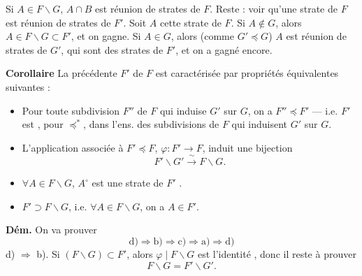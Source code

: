 \documentclass[11pt,a4paper]{article}
\begin{document}
Si $A \in F \smallsetminus G$, $A \cap B$ est réunion de strates de $F$.  Reste : voir qu'une strate  de $F$ est réunion de strates de $F'$. Soit $A$ cette strate de $F$.   Si $A \notin G$, alors $A \in F \smallsetminus G \subset F'$, et on gagne. Si $A \in G$, alors (comme $G' \preccurlyeq G$) $A$ est réunion de strates de $G'$, qui sont des strates de $F'$, et on a gagné encore.

\textbf{Corollaire} La   précédente $F'$ de $F$ est caractérisée par  propriétés équivalentes suivantes :
\begin{itemize}
  \item[a)] Pour toute subdivision $F''$ de $F$ qui induise $G'$ sur $G$, on a $F'' \preccurlyeq F'$ — i.e. $F'$ est  , pour $\preccurlyeq^{*}$, dans l'ens. des subdivisions de $F$ qui induisent $G'$ sur $G$.
  \item[b)] L'application  associée à $F' \preccurlyeq F$, $\varphi : F' \to F$, induit une bijection
  \[
    F' \smallsetminus G' \xrightarrow{\ \sim\ } F \smallsetminus G .
  \]
  \item[c)] $\forall A \in F \smallsetminus G$, $A^{\circ}$ est une strate \struck{\ill{}} de $F'$ \struck{\ill{}}.
  \item[d)] $F' \supset F \smallsetminus G$, i.e. $\forall A \in F \smallsetminus G$, on a $A \in F'$.
\end{itemize}

\textbf{Dém.} On va prouver
\[
  \text{d)} \Longrightarrow \text{b)} \Longrightarrow \text{c)} \Longrightarrow \text{a)} \Longrightarrow \text{d)}
\]
 d) $\Longrightarrow$ b). Si $(F \smallsetminus G) \subset F'$, alors $\varphi \mid F \smallsetminus G$ est l'identité ,  donc il reste à prouver
\[
  F \smallsetminus G = F' \smallsetminus G' .
\]
\end{document}
